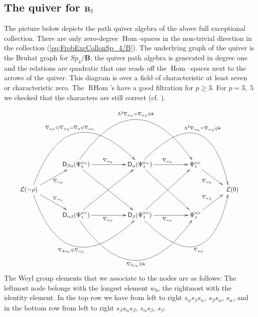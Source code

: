 \documentclass[sn-mathphys-num]{sn-jnl}%
\newcommand{\Ll}{\mathcal L}
\newcommand*{\Hom}{\mathop{\mathrm {Hom}}\nolimits}
\newcommand*{\RHom}{\mathop{\mathrm {RHom}}\nolimits}
\newcommand{\sd}{\sf D}
\newcommand{\fb}{\mathbf B}
\newcommand{\oa}{\omega_\alpha}
\newcommand{\ob}{\omega_\beta}
\theoremstyle{definition}
\begin{document}
\subsection{ The quiver for ${\bf B}_2$}


The picture below depicts the path quiver algebra of the above full exceptional collection. There are only zero-degree $\Hom$-spaces in the non-trivial direction in the collection (\ref{eq:FrobExcCollonSp_4/B}). The underlying graph of the quiver is the Bruhat graph for $Sp_4/{\fb}$; the quiver path algebra is generated in degree one and the relations are quadratic that one reads off the $\Hom$--spaces next to the arrows of the quiver. 
This diagram is over a field of characteristic at least seven or characteristic zero.  The $\RHom$'s have a good filtration  for $p\geq3$. For $p=3,\;5$ we checked that the characters are still correct (cf. \cite[Section 2.6, (7)]{Donkin2}).
 

\begin{equation}\label{eq:quiverFrobExcCollonSp_4/B}
\scalebox{.9}{\xymatrix{
& {\sd}_{\beta\alpha}(\Psi _1^{\oa})\ar[rrdd]\ar[rr]^{\nabla _{\oa}}\ar@/^6pc/[rrrr]^{\Lambda ^2\nabla _{\oa}=\nabla _{\ob}\oplus {\sf k}}  & & {\sd}_{\alpha}(\Psi _1^{\oa})\ar[rr]^{\nabla _{\oa}} \ar[rrdd]\ar@/^6pc/[rrrd]^{\Lambda ^2\nabla _{\oa}=\nabla _{\ob}\oplus {\sf k}} & & \Psi _1^{\oa}\ar[rd]_{\nabla _{\oa}} \\
\Ll (-\rho) \ar@/^6pc/[rrru]^{\nabla _{\oa}\otimes \nabla _{\ob}= \nabla _{\rho}\oplus \nabla _{\oa}}\ar@/_6pc/[rrrd]_{\nabla _{2\oa}\oplus \nabla _{\ob}}\ar[rd]^{\nabla _{\oa}}\ar[ru]_{\nabla _{\ob}} \quad  &   & &  &  & &  \quad \Ll (0)\\
& {\sd}_{\alpha\beta}(\Psi _1^{\ob})\ar[rr]_{\nabla _{\oa}}\ar[rruu]\ar@/_6pc/[rrrr]_{\nabla _{2\oa}\oplus {\sf k}} & &  {\sd}_{\beta}(\Psi _1^{\ob})\ar[rr]_{\nabla _{\oa}}\ar[rruu]\ar@/_6pc/[urrr]_{\nabla _{\oa}}  & & \Psi _1^{\ob}\ar[ru]^{\nabla _{\ob}} \\
}
}
\end{equation}
The Weyl group elements that we associate to the nodes are
as follows: The leftmost node belongs with the longest element $w_0$, the rightmost with the identity element. In the top row we have from left to right 
$s_\alpha s_\beta s_\alpha $, 
$s_\beta  s_\alpha   $, 
$s_\alpha  $, 
and in the bottom row from left to right
$s_\beta s_\alpha s_\beta$, 
$s_\alpha s_\beta $, 
$s_\beta$. 
\end{document}
